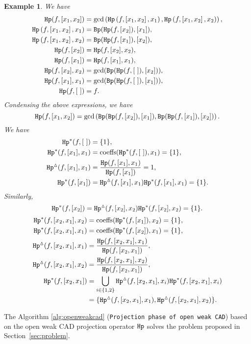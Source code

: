 \documentclass[amsthm]{elsart}
\def \coeffs{{\rm coeffs}}
\def \Bproj  {{\tt Bp}}
\def  \Hproj {{\tt Hp}}
\newtheorem{ex}{Example}   \renewcommand{\algorithmicrequire}{\textsf{Input:}}
\begin{document}
\begin{ex}\label{ex:step}
We have
\begin{align*}
\Hproj(f,\left[  x_{1},x_{2}\right]  )  & =\gcd\left(  \Hproj\left(  f,\left[
x_{1},x_{2}\right]  ,x_{1}\right)  ,\Hproj\left(  f,\left[  x_{1},x_{2}\right]  ,x_{2}\right)  \right),  \\
\Hproj\left(  f,\left[  x_{1},x_{2}\right]  ,x_{1}\right)    &
=\Bproj(\Hproj(f,\left[  x_{2}\right]  ),[x_{1}]),\\
\Hproj\left(  f,\left[  x_{1},x_{2}\right]  ,x_{2}\right)    &
=\Bproj(\Hproj(f,\left[  x_{1}\right]  ),[x_{2}]),\\
\Hproj(f,\left[  x_{2}\right]  )  & =\Hproj(f,[x_{2}],x_{2}),\\
\Hproj(f,\left[  x_{1}\right]  )  & =\Hproj(f,[x_{1}],x_{1}),\\
\Hproj(f,[x_{2}],x_{2})  & =\gcd(\Bproj(\Hproj(f,[~]),[x_{2}])),\\
\Hproj(f,[x_{1}],x_{1})  & =\gcd(\Bproj(\Hproj(f,[~]),[x_{1}])),\\
\Hproj(f,[~])  & =f.
\end{align*}
Condensing the above expressions, we have\[
\Hproj(f,\left[  x_{1},x_{2}\right]  )=\gcd\left(  \Bproj(\Bproj(f,[x_{2}]),[x_{1}]),\Bproj(\Bproj(f,[x_{1}]),[x_{2}])\right).
\]
We have
\begin{align*}
{\Hproj^{\ast}(f,[~])}&=\{1\},\\
{\Hproj^{\ast}(f,[x_1],x_1)}&=\coeffs({\Hproj^{\ast}(f,[~])},x_1)=\{1\},\\
{\Hproj^{\vartriangle}(f,[x_1],x_1)}&=\frac{\Hproj(f,[x_1],x_1)}{\Hproj(f,[x_1])}=1,\\
{\Hproj^{\ast}(f,[x_1])}&={\Hproj^{\vartriangle}(f,[x_1],x_1)}{\Hproj^{\ast}(f,[x_1],x_1)}=\{1\}.
\end{align*}
Similarly,
$${\Hproj^{\ast}(f,[x_2])}={\Hproj^{\vartriangle}(f,[x_2],x_2)}{\Hproj^{\ast}(f,[x_2],x_2)}=\{1\}.$$
\begin{align*}
{\Hproj^{\ast}(f,[x_2,x_1],x_2)}&=\coeffs({\Hproj^{\ast}(f,[x_1])},x_2)=\{1\},\\
{\Hproj^{\ast}(f,[x_2,x_1],x_1)}&=\coeffs({\Hproj^{\ast}(f,[x_2])},x_1)=\{1\},\\
{\Hproj^{\vartriangle}(f,[x_2,x_1],x_1)}&=\frac{\Hproj(f,[x_2,x_1],x_1)}{\Hproj(f,[x_2,x_1])},\\
{\Hproj^{\vartriangle}(f,[x_2,x_1],x_2)}&=\frac{\Hproj(f,[x_2,x_1],x_2)}{\Hproj(f,[x_2,x_1])},\\
{\Hproj^{\ast}(f,[x_2,x_1])}&=\bigcup_{i\in\{1,2\}}{\Hproj^{\vartriangle}(f,[x_2,x_1],x_i)}{\Hproj^{\ast}(f,[x_2,x_1],x_i)}\\
&=\{{\Hproj^{\vartriangle}(f,[x_2,x_1],x_1)},{\Hproj^{\vartriangle}(f,[x_2,x_1],x_2)}\}.
\end{align*}
\end{ex}
The Algorithm \ref{alg:openweakcad} ({\tt Projection phase of open weak CAD}) based on the open weak CAD projection operator $\Hproj$ solves the problem proposed in Section~\ref{sec:problem}.
\end{document}
